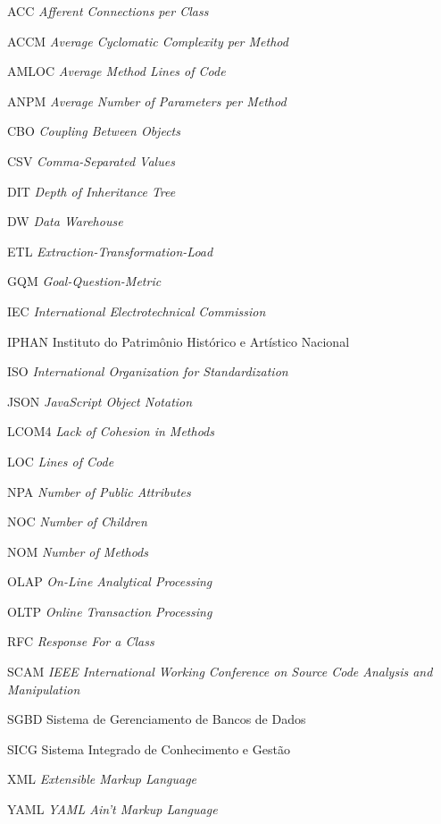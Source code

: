 \begin{siglas}
\item [ACC]   \textit{Afferent Connections per Class}
\item [ACCM]  \textit{Average Cyclomatic Complexity per Method}
\item [AMLOC] \textit{Average Method Lines of Code}
\item [ANPM]  \textit{Average Number of Parameters per Method}
\item [CBO]   \textit{Coupling Between Objects}
\item [CSV]   \textit{Comma-Separated Values}
\item [DIT]	  \textit{Depth of Inheritance Tree}
\item [DW]	  \textit{Data Warehouse}
\item [ETL]   \textit{Extraction-Transformation-Load}
\item [GQM]   \textit{Goal-Question-Metric}
\item [IEC]   \textit{International Electrotechnical Commission}
\item [IPHAN] Instituto do Patrimônio Histórico e Artístico Nacional
\item [ISO]   \textit{International Organization for Standardization}
\item [JSON]   \textit{JavaScript Object Notation}
\item [LCOM4] \textit{Lack of Cohesion in Methods}
\item [LOC]   \textit{Lines of Code}
\item [NPA]   \textit{Number of Public Attributes}
\item [NOC]   \textit{Number of Children}
\item [NOM]   \textit{Number of Methods}
\item [OLAP]  \textit{On-Line Analytical Processing}
\item [OLTP]  \textit{Online Transaction Processing}
\item [RFC]   \textit{Response For a Class}
\item [SCAM]  \textit{IEEE International Working Conference on Source Code Analysis and Manipulation}
\item [SGBD]  Sistema de Gerenciamento de Bancos de Dados
\item [SICG]  Sistema Integrado de Conhecimento e Gestão
\item [XML]    \textit{Extensible Markup Language}
\item [YAML]   \textit{YAML Ain't Markup Language}  
\end{siglas}
